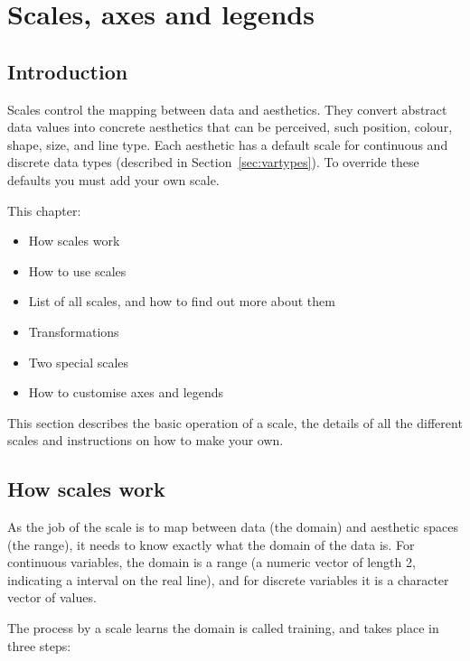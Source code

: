 
\chapter{Scales, axes and legends}

\section{Introduction}

Scales control the mapping between data and aesthetics.  They convert abstract data values into concrete aesthetics that can be perceived, such position, colour, shape, size, and line type.  Each aesthetic has a default scale for continuous and discrete data types (described in Section~\ref{sec:vartypes}).  To override these defaults you must add your own scale.  

This chapter:

\begin{itemize}
  \item How scales work
  \item How to use scales
  \item List of all scales, and how to find out more about them
  \item Transformations
  \item Two special scales
  \item How to customise axes and legends
\end{itemize}

This section describes the basic operation of a scale, the details of all the different scales and instructions on how to make your own.

\section{How scales work}

As the job of the scale is to map between data (the domain) and aesthetic spaces (the range), it needs to know exactly what the domain of the data is. For continuous variables, the domain is a range (a numeric vector of length 2, indicating a interval on the real line), and for discrete variables it is a character vector of values.  

The process by a scale learns the domain is called training, and takes place in three steps:

